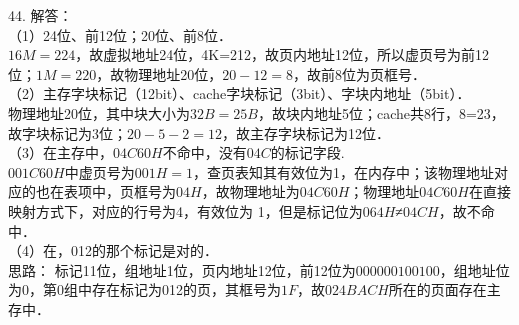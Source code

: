 44. 解答： \\
（1）24位、前12位；20位、前8位． \\
$16M=224$，故虚拟地址24位，4K=212，故页内地址12位，所以虚页号为前12位；$1M=220$，故物理地址20位，$20-12=8$，故前8位为页框号． \\
（2）主存字块标记（12bit）、cache字块标记（3bit）、字块内地址（5bit）． \\
物理地址20位，其中块大小为$32B=25B$，故块内地址5位；cache共8行，8=23，故字块标记为3位；$20-5-2=12$，故主存字块标记为12位． \\
（3）在主存中，$04C60H$不命中，没有$04C$的标记字段. \\
$001C60H$中虚页号为$001H=1$，查页表知其有效位为1，在内存中；该物理地址对应的也在表项中，页框号为$04H$，故物理地址为$04C60H$；物理地址$04C60H$在直接映射方式下，对应的行号为4，有效位为 1，但是标记位为$064H$≠$04CH$，故不命中． \\
（4）在，012的那个标记是对的． \\
思路： 标记11位，组地址1位，页内地址12位，前12位为$0000 0010 0100$，组地址位为0，第0组中存在标记为012的页，其框号为$1F$，故$024BACH$所在的页面存在主存中．

